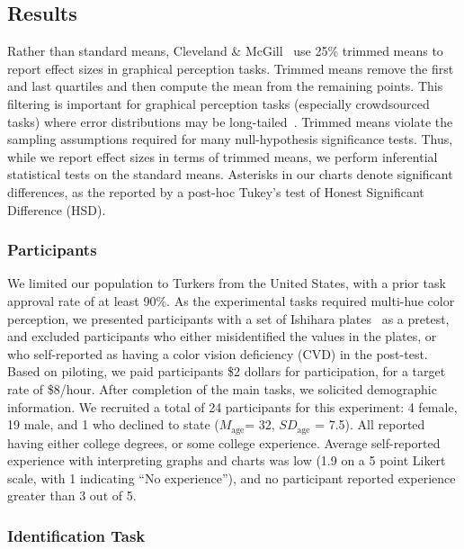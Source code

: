 \subsection{Results}

Rather than standard means, Cleveland \& McGill~\cite{cleveland1984graphical} use 25\% trimmed means to report effect sizes in graphical perception tasks. Trimmed means remove the first and last quartiles and then compute the mean from the remaining points. This filtering is important for graphical perception tasks (especially crowdsourced tasks) where error distributions may be long-tailed~\cite{heer2010crowdsourcing}. Trimmed means violate the sampling assumptions required for many null-hypothesis significance tests. Thus, while we report effect sizes in terms of trimmed means, we perform inferential statistical tests on the standard means. Asterisks in our charts denote significant differences, as the reported by a post-hoc Tukey's test of Honest Significant Difference (HSD). 

\subsubsection{Participants}

We limited our population to Turkers from the United States, with a prior task approval rate of at least 90\%. As the experimental tasks required multi-hue color perception, we presented participants with a set of Ishihara plates~\cite{hardy1945tests} as a pretest, and excluded participants who either misidentified the values in the plates, or who self-reported as having a color vision deficiency (CVD) in the post-test. Based on piloting, we paid participants \$2 dollars for participation, for a target rate of \$8/hour. After completion of the main tasks, we solicited demographic information. We recruited a total of 24 participants for this experiment: 4 female, 19 male, and 1 who declined to state ($M_{\text{age}}$= 32, $SD_{\text{age}}$ = 7.5). All reported having either college degrees, or some college experience. Average self-reported experience with interpreting graphs and charts was low (1.9 on a 5 point Likert scale, with 1 indicating ``No experience''), and no participant reported experience greater than 3 out of 5.

\subsubsection{Identification Task}
\accuracyFig
\responseTimeFig

